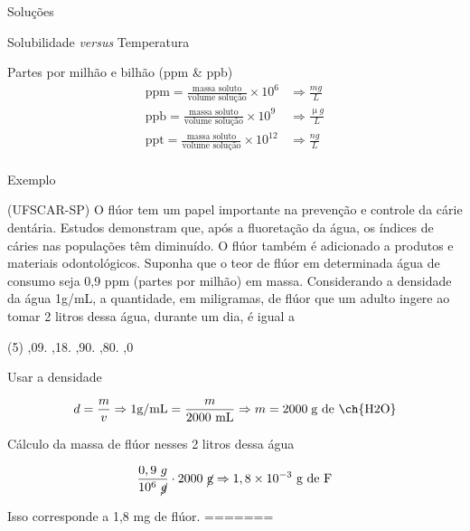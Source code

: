 \documentclass[presentation,professionalfonts,aspectratio=169]{beamer}
\begin{document}
\begin{frame}[label={sec:orgbd3cab3}]{Soluções}
\begin{description}
\begin{frame}[label={sec:org3015545}]{Solubilidade \emph{versus} Temperatura}
\begin{frame}[label={sec:org5a2482e}]{Partes por milhão e bilhão (ppm \& ppb)}
\begin{align*}
\text{ppm}=\frac{\text{massa soluto}}{\text{volume solução}} \times 10^6 & \Rightarrow  \frac{mg}{L}\\
\text{ppb}=\frac{\text{massa soluto}}{\text{volume solução}} \times 10^9 & \Rightarrow  \frac{\upmu g}{L}\\
\text{ppt}=\frac{\text{massa soluto}}{\text{volume solução}} \times 10^{12} & \Rightarrow  \frac{ng}{L}\\
\end{align*}
\end{frame}



\begin{frame}[label={sec:org761dc1a}]{Exemplo}
\begin{question}
\alert{(UFSCAR-SP)} O flúor tem um papel importante na prevenção e controle da cárie dentária. Estudos demonstram que, após a fluoretação da água, os índices de cáries nas populações têm diminuído. O flúor também é adicionado a produtos e materiais odontológicos. Suponha que o teor de flúor em determinada água de consumo seja 0,9 ppm (partes por milhão) em massa. Considerando a densidade da água 1g/mL, a quantidade, em miligramas, de flúor que um adulto ingere ao tomar 2 litros dessa água, durante um dia, é igual a

\begin{choice}(5)
,09.
,18.
,90.
,80.
,0
\end{choice}
\end{question}
\end{frame}

\begin{frame}[label={sec:orge830c79}]{}
\begin{answer}[print=true]


Usar a densidade

\begin{align*}
d=\frac{m}{v} \Rightarrow 1 \text{g/mL}=\frac{m}{2000~\text{mL}} \Rightarrow  m = 2000 \; \text{g de \ch{H2O}}
\end{align*}

Cálculo da massa de flúor nesses 2 litros dessa água

\begin{align*}
\frac{0,9~g}{10^6~ \cancel{g}} \cdot 2000~\text{\cancel{g}} \Rightarrow 1,8 \times 10^{-3}~\text{g de F} 
\end{align*}

Isso corresponde a 1,8 mg de  flúor.
=======


\end{answer}
\end{frame}
\end{frame}
\end{description}
\end{frame}
\end{document}

